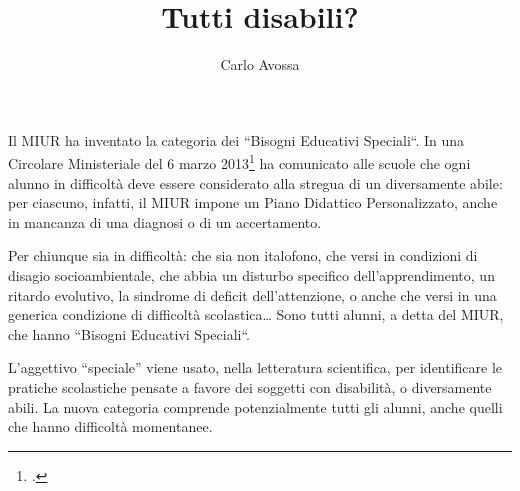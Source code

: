 \author{Carlo Avossa}
\title{Tutti disabili?}
\label{cha:carlovavossa141013}
\maketitle
{}
Il MIUR ha inventato la categoria dei “Bisogni Educativi Speciali“. In una Circolare Ministeriale del 6 marzo 2013\footcite{cm8_2013} ha comunicato alle scuole che ogni alunno in difficoltà deve essere considerato alla stregua di un diversamente abile: per ciascuno, infatti, il MIUR impone un Piano Didattico Personalizzato, anche in mancanza di una diagnosi o di un accertamento.

Per chiunque sia in difficoltà: che sia non italofono, che versi in condizioni di disagio socioambientale, che abbia un disturbo specifico dell'apprendimento, un ritardo evolutivo, la sindrome di deficit dell'attenzione, o anche che versi in una generica condizione di difficoltà scolastica… Sono tutti alunni, a detta del MIUR, che hanno “Bisogni Educativi Speciali“.

L'aggettivo “speciale” viene usato, nella letteratura scientifica, per identificare le pratiche scolastiche pensate a favore dei soggetti con disabilità, o diversamente abili. La nuova categoria comprende potenzialmente tutti gli alunni, anche quelli che hanno difficoltà momentanee.

